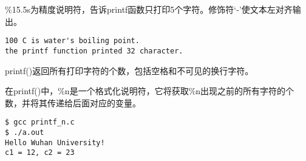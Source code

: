 \begin{frame}[fragile]
\tf\%15.5s为精度说明符，告诉printf函数只打印5个字符。修饰符‘-’使文本左对齐输出。
\end{frame}

\begin{frame}[fragile]

\end{frame}

\begin{frame}[fragile]
\begin{lstlisting}[backgroundcolor=\color{red!20}]
100 C is water's boiling point.
the printf function printed 32 character.
\end{lstlisting}
\end{frame}

\begin{frame}[fragile]
printf()返回所有打印字符的个数，包括空格和不可见的换行字符。
\end{frame}


\begin{frame}[fragile]
在{\tf printf()}中，{\tf \%n}是一个格式化说明符，它将获取{\tf \%n}出现之前的所有字符的个数，并将其传递给后面对应的变量。
\end{frame}


\begin{frame}[fragile]

\end{frame}


\begin{frame}[fragile]
\begin{lstlisting}[backgroundcolor=\color{red!20}]
$ gcc printf_n.c
$ ./a.out 
Hello Wuhan University!
c1 = 12, c2 = 23
\end{lstlisting}
\end{frame}



